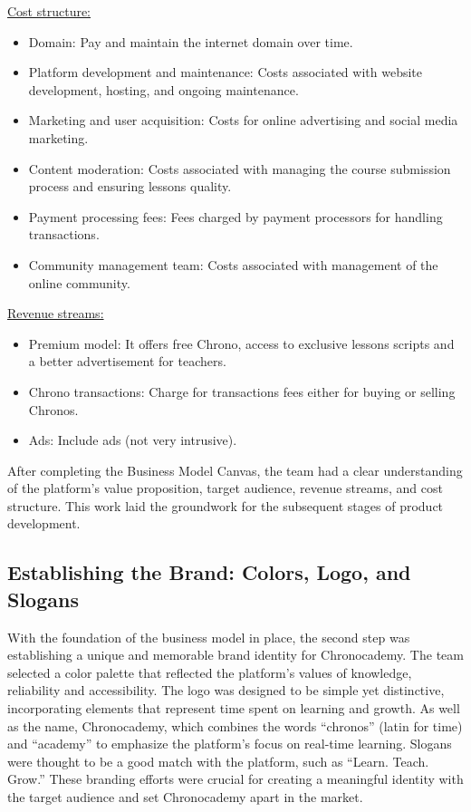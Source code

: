 \underline{Cost structure:}
\begin{itemize}
    \item Domain: Pay and maintain the internet domain over time.
    \item Platform development and maintenance: Costs associated with website development, hosting, and ongoing maintenance.
    \item Marketing and user acquisition: Costs for online advertising and social media marketing.
    \item Content moderation: Costs associated with managing the course submission process and ensuring lessons quality.
    \item Payment processing fees: Fees charged by payment processors for handling transactions.
    \item Community management team: Costs associated with management of the online community.
\end{itemize}

\underline{Revenue streams:}
\begin{itemize}
    \item Premium model: It offers free Chrono, access to exclusive lessons scripts and a better advertisement for teachers.
    \item Chrono transactions: Charge for transactions fees either for buying or selling Chronos.
    \item Ads: Include ads (not very intrusive).
\end{itemize}

After completing the Business Model Canvas, the team had a clear understanding of the platform's value proposition, target audience, revenue streams, and cost structure.
This work laid the groundwork for the subsequent stages of product development.

\subsection{Establishing the Brand: Colors, Logo, and Slogans}\label{subsec:colors-logo-slogans}
With the foundation of the business model in place, the second step was establishing a unique and memorable brand identity for Chronocademy.
The team selected a color palette that reflected the platform’s values of knowledge, reliability and accessibility.
The logo was designed to be simple yet distinctive, incorporating elements that represent time spent on learning and growth.
As well as the name, Chronocademy, which combines the words ``chronos'' (latin for time) and ``academy'' to emphasize the platform's focus on real-time learning.
Slogans were thought to be a good match with the platform, such as ``Learn.
Teach.
Grow.'' These branding efforts were crucial for creating a meaningful identity with the target audience and set Chronocademy apart in the market.

